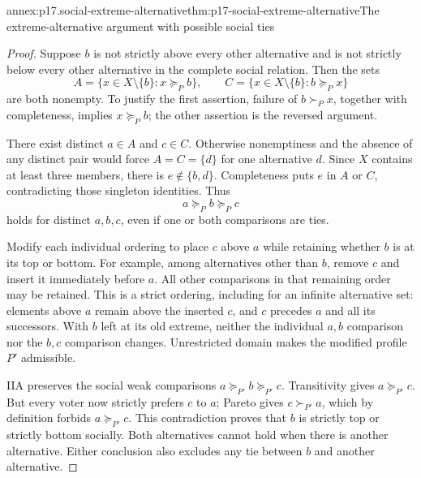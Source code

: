 \begin{annexitem}{annex:p17.social-extreme-alternative}{thm:p17-social-extreme-alternative}{The extreme-alternative argument with possible social ties}
\begin{proof}
Suppose \(b\) is not strictly above every other alternative and is not
strictly below every other alternative in the complete social relation.
Then the sets
\[
 A=\{x\in X\setminus\{b\}:x\succeq_Pb\},\qquad
 C=\{x\in X\setminus\{b\}:b\succeq_Px\}
\]
are both nonempty. To justify the first assertion, failure of
\(b\succ_Px\), together with completeness, implies \(x\succeq_Pb\);
the other assertion is the reversed argument.

There exist distinct \(a\in A\) and \(c\in C\). Otherwise nonemptiness
and the absence of any distinct pair would force \(A=C=\{d\}\) for
one alternative \(d\). Since \(X\) contains at least three members,
there is \(e\notin\{b,d\}\). Completeness puts \(e\) in \(A\) or \(C\),
contradicting those singleton identities. Thus
\[
                         a\succeq_Pb\succeq_Pc
\]
holds for distinct \(a,b,c\), even if one or both comparisons are ties.

Modify each individual ordering to place \(c\) above \(a\) while retaining
whether \(b\) is at its top or bottom. For example, among alternatives
other than \(b\), remove \(c\) and insert it immediately before \(a\).
All other comparisons in that remaining order may be retained.
This is a strict ordering, including for an infinite alternative set:
elements above \(a\) remain above the inserted \(c\), and \(c\) precedes
\(a\) and all its successors. With \(b\) left at its old extreme, neither
the individual \(a,b\) comparison nor the \(b,c\) comparison changes.
Unrestricted domain makes the modified profile \(P'\) admissible.

IIA preserves the social weak comparisons
\(a\succeq_{P'}b\succeq_{P'}c\). Transitivity gives
\(a\succeq_{P'}c\). But every voter now strictly prefers \(c\) to \(a\);
Pareto gives \(c\succ_{P'}a\), which by definition forbids
\(a\succeq_{P'}c\). This contradiction proves that \(b\) is strictly
top or strictly bottom socially. Both alternatives cannot hold when
there is another alternative. Either conclusion also excludes any tie
between \(b\) and another alternative.
\end{proof}
\end{annexitem}

